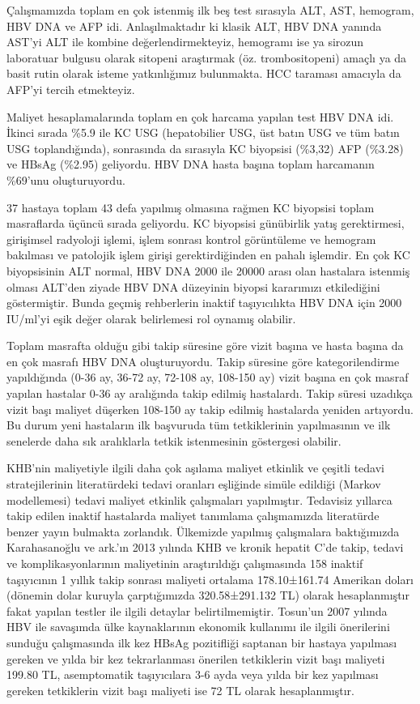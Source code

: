Çalışmamızda toplam en çok istenmiş ilk beş test sırasıyla ALT, AST, hemogram, HBV DNA ve AFP idi. Anlaşılmaktadır ki klasik ALT, HBV DNA yanında AST'yi ALT ile kombine değerlendirmekteyiz, hemogramı ise ya sirozun laboratuar bulgusu olarak sitopeni araştırmak (öz. trombositopeni) amaçlı ya da basit rutin olarak isteme yatkınlığımız bulunmakta. HCC taraması amacıyla da AFP'yi tercih etmekteyiz. 

Maliyet hesaplamalarında toplam en çok harcama yapılan test HBV DNA idi. İkinci sırada \%5.9 ile KC USG (hepatobilier USG, üst batın USG ve tüm batın USG toplandığında), sonrasında da sırasıyla KC biyopsisi (\%3,32) AFP (\%3.28) ve HBsAg (\%2.95) geliyordu. HBV DNA hasta başına toplam harcamanın \%69'unu oluşturuyordu.

37 hastaya toplam 43 defa yapılmış olmasına rağmen KC biyopsisi toplam masraflarda üçüncü sırada geliyordu. KC biyopsisi günübirlik yatış gerektirmesi, girişimsel radyoloji işlemi, işlem sonrası kontrol görüntüleme ve hemogram bakılması ve patolojik işlem girişi gerektirdiğinden en pahalı işlemdir. En çok KC biyopsisinin ALT normal, HBV DNA 2000 ile 20000 arası olan hastalara istenmiş olması ALT'den ziyade HBV DNA düzeyinin biyopsi kararımızı etkilediğini göstermiştir. Bunda geçmiş rehberlerin inaktif taşıyıcılıkta HBV DNA için 2000 IU/ml'yi eşik değer olarak belirlemesi rol oynamış olabilir.

Toplam masrafta olduğu gibi takip süresine göre vizit başına ve hasta başına da en çok masrafı HBV DNA oluşturuyordu. Takip süresine göre kategorilendirme yapıldığında (0-36 ay, 36-72 ay, 72-108 ay, 108-150 ay) vizit başına en çok masraf yapılan hastalar 0-36 ay aralığında takip edilmiş hastalardı. Takip süresi uzadıkça vizit başı maliyet düşerken 108-150 ay takip edilmiş hastalarda yeniden artıyordu. Bu durum yeni hastaların ilk başvuruda tüm tetkiklerinin yapılmasının ve ilk senelerde daha sık aralıklarla tetkik istenmesinin göstergesi olabilir. 

KHB'nin maliyetiyle ilgili daha çok aşılama maliyet etkinlik ve çeşitli tedavi stratejilerinin literatürdeki tedavi oranları eşliğinde simüle edildiği (Markov modellemesi) tedavi maliyet etkinlik çalışmaları yapılmıştır. Tedavisiz yıllarca takip edilen inaktif hastalarda maliyet tanımlama çalışmamızda literatürde benzer yayın bulmakta zorlandık. Ülkemizde yapılmış çalışmalara baktığımızda Karahasanoğlu ve ark.'ın 2013 yılında KHB ve kronik hepatit C'de takip, tedavi ve komplikasyonlarının maliyetinin araştırıldığı çalışmasında \cite{karahasanouglu2013costs} 158 inaktif taşıyıcının 1 yıllık takip sonrası maliyeti ortalama 178.10±161.74 Amerikan doları (dönemin dolar kuruyla çarptığımızda 320.58±291.132 TL) olarak hesaplanmıştır fakat yapılan testler ile ilgili detaylar belirtilmemiştir. Tosun'un 2007 yılında HBV ile savaşımda ülke kaynaklarının ekonomik kullanımı ile ilgili önerilerini sunduğu çalışmasında \cite{tosun2007hepatit} ilk kez HBsAg pozitifliği saptanan bir hastaya yapılması gereken ve yılda bir kez tekrarlanması önerilen tetkiklerin vizit başı maliyeti 199.80 TL, asemptomatik taşıyıcılara 3-6 ayda veya yılda bir kez yapılması gereken tetkiklerin vizit başı maliyeti ise 72 TL olarak hesaplanmıştır.

